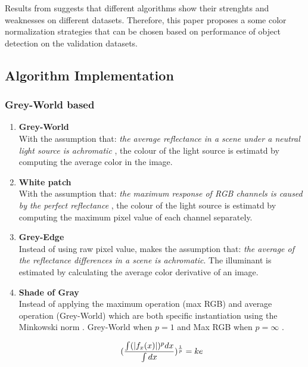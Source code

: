\documentclass[fypca]{socreport}
\DeclarePairedDelimiter{\abs}{\lvert}{\rvert}
\begin{document}
Results from  suggests that different
algorithms show their strenghts and weaknesses on different datasets. Therefore,
this paper proposes a some color normalization strategies that can be chosen
based on performance of object detection on the validation datasets.

\subsection{Algorithm Implementation}


\subsubsection{Grey-World based}

\begin{enumerate}

\item \textbf{Grey-World} \\ 
With the assumption that: \textit{the average reflectance
in a scene under a neutral light source is achromatic} , the colour of the light
source is estimatd by computing the average color in the image.

\item \textbf{White patch} \\
With the assumption that: \textit{the maximum response of RGB channels is caused
by the perfect reflectance} , the colour of the light
source is estimatd by computing the maximum pixel value of each channel separately.

\item \textbf{Grey-Edge} \\
Instead of using raw pixel value,  makes the assumption
that: \textit{the average of the reflectance differences in a scene is
  achromatic}. The illuminant is estimated by calculating the average color
derivative of an image.

\item \textbf{Shade of Gray} \\
Instead of applying the maximum operation (max RGB) and average operation
(Grey-World) which are both specific instantiation using the Minkowski norm
. Grey-World when $p=1$ and Max RGB when $p=\infty$ .

\[
  (\frac{\int (\abs{f_x(x)})^p dx}{\int dx})^{\frac{1}{p}} = ke
\]

\end{enumerate}
\end{document}
